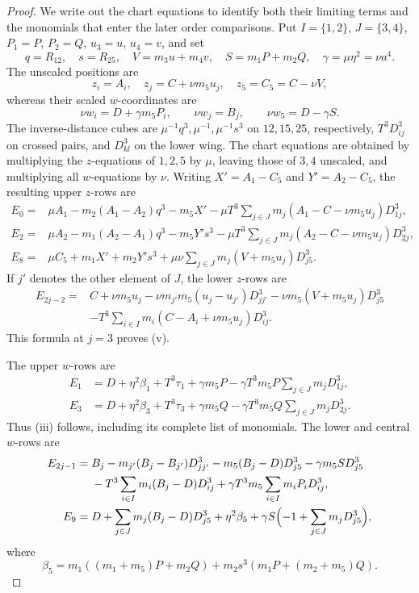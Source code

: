 \documentclass[Threeside,11pt]{article}
\theoremstyle{definition}
\theoremstyle{remark}
\numberwithin{equation}{section}
\theoremstyle{remark}
\begin{document}
{\begin{proof}
We write out the chart equations to identify both their limiting terms and the
monomials that enter the later order comparisons.
Put $I=\{1,2\}$, $J=\{3,4\}$, $P_1=P$, $P_2=Q$, $u_3=u$, $u_4=v$,
and set
\[
q=R_{12},\quad s=R_{25},\quad V=m_3u+m_4v,\quad S=m_1P+m_2Q,
\quad \gamma=\mu\eta^2=\nu a^4.
\]
The unscaled positions are
\[
z_i=A_i,\quad z_j=C+\nu m_5u_j,\quad z_5=C_5=C-\nu V,
\]
whereas their scaled $w$-coordinates are
\[
\nu w_i=D+\gamma m_5P_i,\qquad
\nu w_j=B_j,\qquad \nu w_5=D-\gamma S.
\]
The inverse-distance cubes are $\mu^{-1}q^3,\mu^{-1},\mu^{-1}s^3$
on $12,15,25$, respectively, $T^3D_{ij}^3$ on crossed pairs, and
$D_{kl}^3$ on the lower wing.
The chart equations are obtained by multiplying the $z$-equations of $1,2,5$
by $\mu$, leaving those of $3,4$ unscaled, and multiplying all $w$-equations by $\nu$.
Writing $X'=A_1-C_5$ and $Y'=A_2-C_5$, the resulting upper $z$-rows are
\begin{align*}
E_0={}&\mu A_1-m_2(A_1-A_2)q^3-m_5X'
 -\mu T^3\sum_{j\in J}m_j(A_1-C-\nu m_5u_j)D_{1j}^3,\\
E_2={}&\mu A_2-m_1(A_2-A_1)q^3-m_5Y's^3
 -\mu T^3\sum_{j\in J}m_j(A_2-C-\nu m_5u_j)D_{2j}^3,\\
E_8={}&\mu C_5+m_1X'+m_2Y's^3
 +\mu\nu\sum_{j\in J}m_j(V+m_5u_j)D_{j5}^3.
\end{align*}
If $j'$ denotes the other element of $J$, the lower $z$-rows are
\begin{align*}
E_{2j-2}={}&C+\nu m_5u_j
 -\nu m_{j'}m_5(u_j-u_{j'})D_{jj'}^3
 -\nu m_5(V+m_5u_j)D_{j5}^3\\
&-T^3\sum_{i\in I}m_i(C-A_i+\nu m_5u_j)D_{ij}^3.
\end{align*}
This formula at $j=3$ proves (v).

The upper $w$-rows are
\begin{align*}
E_1&=D+\eta^2\beta_1+T^3\tau_1
 +\gamma m_5P-\gamma T^3m_5P\sum_{j\in J}m_jD_{1j}^3,\\
E_3&=D+\eta^2\beta_3+T^3\tau_3
 +\gamma m_5Q-\gamma T^3m_5Q\sum_{j\in J}m_jD_{2j}^3.
\end{align*}
Thus (iii) follows, including its complete list of monomials.
The lower and central $w$-rows are
\begin{align*}
E_{2j-1}={}&B_j-m_{j'}(B_j-B_{j'})D_{jj'}^3-m_5(B_j-D)D_{j5}^3
 -\gamma m_5 S D_{j5}^3\\
&-T^3\sum_{i\in I}m_i(B_j-D)D_{ij}^3
 +\gamma T^3m_5\sum_{i\in I}m_iP_iD_{ij}^3,\\
E_9={}&D+\sum_{j\in J}m_j(B_j-D)D_{j5}^3
 +\eta^2\beta_5+\gamma S\Bigl(-1+\sum_{j\in J}m_jD_{j5}^3\Bigr),
\end{align*}
where
\[
\beta_5=m_1((m_1+m_5)P+m_2Q)
 +m_2s^3(m_1P+(m_2+m_5)Q).
\]


\end{proof}}
\end{document}
